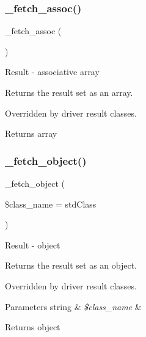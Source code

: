 \subsubsection{\texorpdfstring{\+\_\+fetch\+\_\+assoc()}{\_fetch\_assoc()}}
{\footnotesize\ttfamily \+\_\+fetch\+\_\+assoc (\begin{DoxyParamCaption}{ }\end{DoxyParamCaption})\hspace{0.3cm}{\ttfamily [protected]}}

Result -\/ associative array

Returns the result set as an array.

Overridden by driver result classes.

\begin{DoxyReturn}{Returns}
array 
\end{DoxyReturn}
\mbox{\label{class_c_i___d_b__result_a60806be6a9c2488820813c2a7f4fef71}} 
\subsubsection{\texorpdfstring{\+\_\+fetch\+\_\+object()}{\_fetch\_object()}}
{\footnotesize\ttfamily \+\_\+fetch\+\_\+object (\begin{DoxyParamCaption}\item[{}]{\$class\+\_\+name = {\ttfamily \textquotesingle{}stdClass\textquotesingle{}} }\end{DoxyParamCaption})\hspace{0.3cm}{\ttfamily [protected]}}

Result -\/ object

Returns the result set as an object.

Overridden by driver result classes.


\begin{DoxyParams}[1]{Parameters}
string & {\em \$class\+\_\+name} & \\
\hline
\end{DoxyParams}
\begin{DoxyReturn}{Returns}
object 
\end{DoxyReturn}
\mbox{\label{class_c_i___d_b__result_a5ac3523f878efb629fae30a7d9156e77}} 

